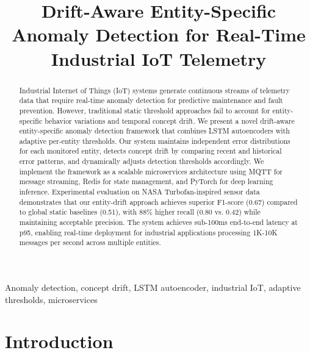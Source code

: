 \documentclass[conference]{IEEEtran}
\begin{document}
\title{Drift-Aware Entity-Specific Anomaly Detection for Real-Time Industrial IoT Telemetry}

\author{
}

\maketitle

\begin{abstract}
Industrial Internet of Things (IoT) systems generate continuous streams of telemetry data that require real-time anomaly detection for predictive maintenance and fault prevention. However, traditional static threshold approaches fail to account for entity-specific behavior variations and temporal concept drift. We present a novel drift-aware entity-specific anomaly detection framework that combines LSTM autoencoders with adaptive per-entity thresholds. Our system maintains independent error distributions for each monitored entity, detects concept drift by comparing recent and historical error patterns, and dynamically adjusts detection thresholds accordingly. We implement the framework as a scalable microservices architecture using MQTT for message streaming, Redis for state management, and PyTorch for deep learning inference. Experimental evaluation on NASA Turbofan-inspired sensor data demonstrates that our entity-drift approach achieves superior F1-score (0.67) compared to global static baselines (0.51), with 88\% higher recall (0.80 vs. 0.42) while maintaining acceptable precision. The system achieves sub-100ms end-to-end latency at p95, enabling real-time deployment for industrial applications processing 1K-10K messages per second across multiple entities.
\end{abstract}

\begin{IEEEkeywords}
Anomaly detection, concept drift, LSTM autoencoder, industrial IoT, adaptive thresholds, microservices
\end{IEEEkeywords}

\section{Introduction}
\end{document}
